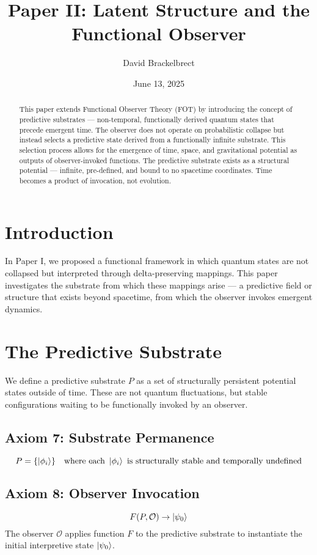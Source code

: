 \documentclass[12pt]{article}
\title{\textbf{Paper II: Latent Structure and the Functional Observer}}
\author{David Brackelbrect}
\date{June 13, 2025}
\begin{document}
\maketitle


\begin{abstract}
This paper extends Functional Observer Theory (FOT) by introducing the concept of predictive substrates — non-temporal, functionally derived quantum states that precede emergent time. The observer does not operate on probabilistic collapse but instead selects a predictive state derived from a functionally infinite substrate. This selection process allows for the emergence of time, space, and gravitational potential as outputs of observer-invoked functions. The predictive substrate exists as a structural potential — infinite, pre-defined, and bound to no spacetime coordinates. Time becomes a product of invocation, not evolution.
\end{abstract}

\section{Introduction}
In Paper I, we proposed a functional framework in which quantum states are not collapsed but interpreted through delta-preserving mappings. This paper investigates the substrate from which these mappings arise — a predictive field or structure that exists beyond spacetime, from which the observer invokes emergent dynamics.

\section{The Predictive Substrate}
We define a predictive substrate $P$ as a set of structurally persistent potential states outside of time. These are not quantum fluctuations, but stable configurations waiting to be functionally invoked by an observer.

\subsection*{Axiom 7: Substrate Permanence}
\[
P = \{ \ket{\phi_i} \} \quad \text{where each } \ket{\phi_i} \text{ is structurally stable and temporally undefined}
\]

\subsection*{Axiom 8: Observer Invocation}
\[
F(P, \mathcal{O}) \rightarrow \ket{\psi_0}
\]
The observer $\mathcal{O}$ applies function $F$ to the predictive substrate to instantiate the initial interpretive state $\ket{\psi_0}$.
\end{document}
